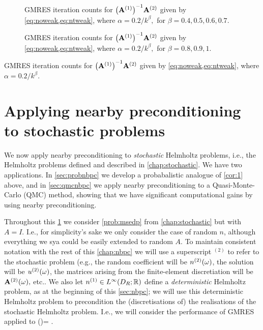\begin{figure}
  
    \caption{GMRES iteration counts for $\AmatoI\Amatt$ given by \cref{eq:noweak,eq:ntweak}, where $\alpha = 0.2/k^\beta,$ for $\beta = 0.4,0.5,0.6,0.7.$}\label{fig:l1med}
\end{figure}
    
    \begin{figure}
    
      \caption{GMRES iteration counts for $\AmatoI\Amatt$ given by \cref{eq:noweak,eq:ntweak}, where $\alpha = 0.2/k^\beta,$ for $\beta = 0.8,0.9,1.$}\label{fig:l1high}
\end{figure}
      
\begin{table}
  \centering
  
  \caption{GMRES iteration counts for $\AmatoI\Amatt$ given by \cref{eq:noweak,eq:ntweak}, where $\alpha = 0.2/k^\beta.$}\label{tab:l1}
  \end{table}

\section{Applying nearby preconditioning to stochastic problems}\label{sec:nbpcstochastic}

We now apply nearby preconditioning to \emph{stochastic} Helmholtz problems, i.e., the Helmholtz problems defined and described in \cref{chap:stochastic}. We have two applications. In \cref{sec:probnbpc} we develop a probabalistic analogue of \cref{cor:1} above, and in \cref{sec:qmcnbpc} we apply nearby preconditioning to a Quasi-Monte-Carlo (QMC) method, showing that we have significant computational gains by using nearby preconditioning.

Throughout this \cref{sec:nbpcstochastic} we consider \cref{prob:msedp} from \cref{chap:stochastic} but with $A=I$. I.e., for simplicity's sake we only consider the case of random $n$, although everything we sya could be easily extended to random $A$. To maintain consistent notation with the rest of this \cref{chap:nbpc} we will use a superscript ${}^{(2)}$ to refer to the stochastic problem (e.g., the random coefficient will be ${n}^{(2)}(\omega)$, the solution will be ${u}^{(2)}(\omega)$, the matrices arising from the finite-element discretiation will be $\mathbf{A}^{(2)}(\omega),$ etc.. We also let $\nso \in \LiDRRR$ define a \emph{deterministic} Helmholtz problem, as at the beginning of this \cref{sec:nbpc}; we will use this deterministic Helmholtz problem to precondition the (discretisations of) the realisations of the stochastic Helmholtz problem. I.e., we will consider the performance of GMRES applied to
\beq\label{eq:stopc}
\AmatoI\Amatt(\omega)\bu = \AmatoI \bff.
\eeq
{}
